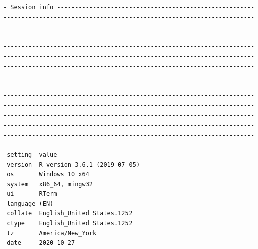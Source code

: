 \documentclass[
]{article}
\begin{document}
\begin{verbatim}
- Session info -----------------------------------------------------------------------------------------------------------------------------------------------------------------------------------------------------------------------------------------------------------------------------------------------------------------------------------------------------------------------------------------------------------------------------------------------------------------------------------------------------------------------------------------------------------------------------------------------------------------------------------------------------------------------------------------------------------------------------------------------------------------------------------------------------------------------------------------------------------------------------------------------------------------------------------------------------------------------------------------------------------------------
 setting  value                       
 version  R version 3.6.1 (2019-07-05)
 os       Windows 10 x64              
 system   x86_64, mingw32             
 ui       RTerm                       
 language (EN)                        
 collate  English_United States.1252  
 ctype    English_United States.1252  
 tz       America/New_York            
 date     2020-10-27                  


\end{verbatim}
\end{document}
